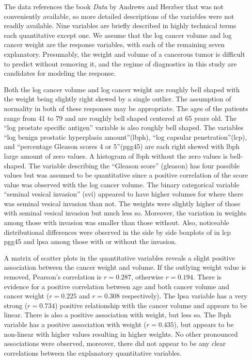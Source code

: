 \documentclass{homework}
\begin{document}
  \begin{solution}
    The data references the book \emph{Data} by Andrews and Herzber that was not conveniently available, so more
    detailed descriptions of the variables were not readily available.  Nine
    variables are briefly described in highly technical terms each quantitative
    except one.  We assume that the log cancer volume and log
    cancer weight are the response variables, with each of the remaining seven
    explanatory.  Presumably, the weight and volume of a cancerous tumor
    is difficult to predict without removing it, and the regime of diagnostics
    in this study are candidates for modeling the response.  
    
    Both the log cancer volume and log cancer weight are roughly bell shaped
    with the weight being slightly right skewed by a single outlier.  The
    assumption of normality in both of these responses may be appropriate. The
    ages of the patients range from 41 to 79 and are roughly bell shaped
    centered at 65 years old.  The ``log prostate specific antigen'' variable
    is also roughly bell shaped.  The variables ``log benign prostatic
    hyperplasia amount''(lbph), ``log capsular penetration''(lcp), and
    ``percentage Gleason scores 4 or 5''(pgg45) are each right skewed with lbph
    large amount of zero values.  A histogram of lbph without the zero values
    is bell-shaped.  The variable describing the ``Gleason score'' (gleason)
    has four possible values but was assumed to be quantitative since a
    positive correlation of the score value was observed with the log cancer
    volume. The binary categorical variable ``seminal vesical invasion'' (svi)  
    appeared to have higher volumes for where there was seminal vesical invasion
    than not. The weights were slightly higher of those with seminal vesical invasion
    but much less so.  Moreover, the variation in weights among those with 
    invasion was smaller than those without.  Also, noticeable distributional differences
    were observed in the side by side boxplots of in lcp pgg45 and lpsa among those with or without the invasion. 

    A matrix of scatter plots in the quantitative variables reveals a slight
    positive association between the cancer weight and volume.  If the outlying
    weight value is removed,  Pearson's correlation is $r=0.287$, otherwise
    $r=0.194$.  There is evidence for a positive correlation between age and
    both cancer volume and cancer weight ($r=0.225$ and $r=0.308$ respectively).  The lpsa
    variable has a very strong ($r=0.734$) positive relationship with the
    cancer volume and appears to be linear.  There is also a positive association with 
    weight, but less so.  The lbph variable has a positive association with weight ($r=0.435$), but
    appears to be non-linear with higher values resulting in higher weights. No other
    pronounced associations were observed, moreover, there did not appear to be any
    clear correlations between the explanatory quantitative variables.  


\end{solution}
\end{document}
